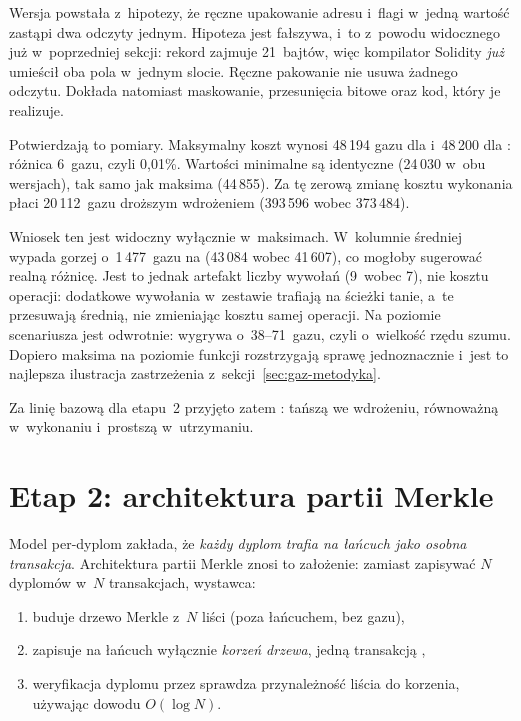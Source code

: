 Wersja  powstała z~hipotezy, że ręczne upakowanie adresu
i~flagi w~jedną wartość  zastąpi dwa odczyty  jednym.
Hipoteza jest fałszywa, i~to z~powodu widocznego już w~poprzedniej sekcji: rekord
 zajmuje 21~bajtów, więc kompilator Solidity \emph{już}
umieścił oba pola w~jednym slocie. Ręczne pakowanie nie usuwa żadnego odczytu.
Dokłada natomiast maskowanie, przesunięcia bitowe oraz kod, który je realizuje.

Potwierdzają to pomiary. Maksymalny koszt  wynosi 48\,194 gazu dla
 i~48\,200 dla : różnica 6~gazu, czyli
0{,}01\%. Wartości minimalne są identyczne (24\,030 w~obu wersjach), tak samo jak
maksima  (44\,855). Za tę zerową zmianę kosztu wykonania
 płaci 20\,112~gazu droższym wdrożeniem (393\,596 wobec
373\,484).

Wniosek ten jest widoczny wyłącznie w~maksimach. W~kolumnie średniej
 wypada gorzej o~1\,477~gazu na 
(43\,084 wobec 41\,607), co mogłoby sugerować realną różnicę. Jest to jednak
artefakt liczby wywołań (9~wobec 7), nie kosztu operacji: dodatkowe wywołania
w~zestawie  trafiają na ścieżki tanie, a~te przesuwają
średnią, nie zmieniając kosztu samej operacji. Na poziomie scenariusza jest odwrotnie:
 wygrywa o~38--71~gazu, czyli o~wielkość rzędu szumu.
Dopiero maksima na poziomie funkcji rozstrzygają sprawę jednoznacznie i~jest to
najlepsza ilustracja zastrzeżenia z~sekcji~\ref{sec:gaz-metodyka}.

Za linię bazową dla etapu~2 przyjęto zatem : tańszą we
wdrożeniu, równoważną w~wykonaniu i~prostszą w~utrzymaniu.

\section{Etap 2: architektura partii Merkle}
\label{sec:gaz-etap2}

Model per-dyplom zakłada, że \emph{każdy dyplom trafia na łańcuch jako osobna
transakcja}. Architektura partii Merkle znosi to założenie: zamiast zapisywać $N$
dyplomów w~$N$ transakcjach, wystawca:
\begin{enumerate}
  \item buduje drzewo Merkle z~$N$ liści (poza łańcuchem, bez gazu),
  \item zapisuje na łańcuch wyłącznie \emph{korzeń drzewa}, jedną transakcją
        ,
  \item weryfikacja dyplomu przez  sprawdza przynależność
        liścia do korzenia, używając dowodu $O(\log N)$.
\end{enumerate}

